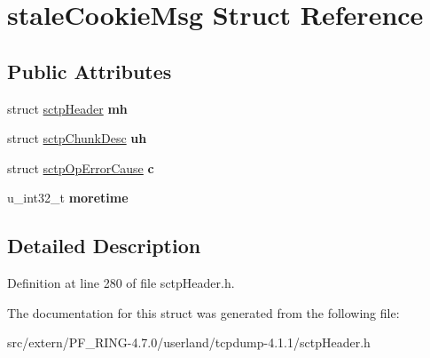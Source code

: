 \hypertarget{structstale_cookie_msg}{
\section{staleCookieMsg Struct Reference}
\label{structstale_cookie_msg}
}
\subsection*{Public Attributes}
\begin{DoxyCompactItemize}
\item 
\hypertarget{structstale_cookie_msg_a150aae8f8d23604172971f8ca681ab48}{
struct \hyperlink{structsctp_header}{sctpHeader} {\bfseries mh}}
\label{structstale_cookie_msg_a150aae8f8d23604172971f8ca681ab48}

\item 
\hypertarget{structstale_cookie_msg_aa51935290bd75d461187a21db26c3fd4}{
struct \hyperlink{structsctp_chunk_desc}{sctpChunkDesc} {\bfseries uh}}
\label{structstale_cookie_msg_aa51935290bd75d461187a21db26c3fd4}

\item 
\hypertarget{structstale_cookie_msg_a2efa039f2b37675265a8c4759f437299}{
struct \hyperlink{structsctp_op_error_cause}{sctpOpErrorCause} {\bfseries c}}
\label{structstale_cookie_msg_a2efa039f2b37675265a8c4759f437299}

\item 
\hypertarget{structstale_cookie_msg_a5ca6e0cb519bbfcaf4b54c24aef8a5a7}{
u\_\-int32\_\-t {\bfseries moretime}}
\label{structstale_cookie_msg_a5ca6e0cb519bbfcaf4b54c24aef8a5a7}

\end{DoxyCompactItemize}


\subsection{Detailed Description}


Definition at line 280 of file sctpHeader.h.



The documentation for this struct was generated from the following file:\begin{DoxyCompactItemize}
\item 
src/extern/PF\_\-RING-\/4.7.0/userland/tcpdump-\/4.1.1/sctpHeader.h\end{DoxyCompactItemize}
